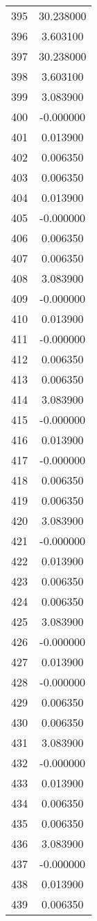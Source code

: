\documentclass[12pt]{article}
\begin{document}
\begin{longtable}{@{}cc@{}}
395 & 30.238000 \\
396 & 3.603100 \\
397 & 30.238000 \\
398 & 3.603100 \\
399 & 3.083900 \\
400 & -0.000000 \\
401 & 0.013900 \\
402 & 0.006350 \\
403 & 0.006350 \\
404 & 0.013900 \\
405 & -0.000000 \\
406 & 0.006350 \\
407 & 0.006350 \\
408 & 3.083900 \\
409 & -0.000000 \\
410 & 0.013900 \\
411 & -0.000000 \\
412 & 0.006350 \\
413 & 0.006350 \\
414 & 3.083900 \\
415 & -0.000000 \\
416 & 0.013900 \\
417 & -0.000000 \\
418 & 0.006350 \\
419 & 0.006350 \\
420 & 3.083900 \\
421 & -0.000000 \\
422 & 0.013900 \\
423 & 0.006350 \\
424 & 0.006350 \\
425 & 3.083900 \\
426 & -0.000000 \\
427 & 0.013900 \\
428 & -0.000000 \\
429 & 0.006350 \\
430 & 0.006350 \\
431 & 3.083900 \\
432 & -0.000000 \\
433 & 0.013900 \\
434 & 0.006350 \\
435 & 0.006350 \\
436 & 3.083900 \\
437 & -0.000000 \\
438 & 0.013900 \\
439 & 0.006350 \\

\end{longtable}
\end{document}
